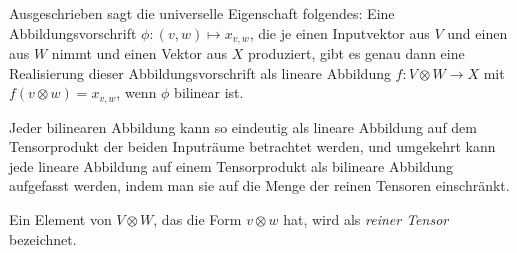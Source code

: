\begin{remark}
Ausgeschrieben sagt die universelle Eigenschaft folgendes: Eine Abbildungsvorschrift $\phi: (v,w) \mapsto x_{v,w}$, die je einen Inputvektor aus $V$ und einen aus $W$ nimmt und einen Vektor aus $X$ produziert, gibt es genau dann eine Realisierung dieser Abbildungsvorschrift als lineare Abbildung $f: V\otimes W\to X$ mit $f(v\otimes w) = x_{v,w}$, wenn $\phi$ bilinear ist.

Jeder bilinearen Abbildung kann so eindeutig als lineare Abbildung auf dem Tensorprodukt der beiden Inputräume betrachtet werden, und umgekehrt kann jede lineare Abbildung auf einem Tensorprodukt als bilineare Abbildung aufgefasst werden, indem man sie auf die Menge der reinen Tensoren einschränkt.
\end{remark}

\begin{definition}\label{tensoren:reine_tensoren}
Ein Element von $V\otimes W$, das die Form $v\otimes w$ hat, wird als \emph{reiner Tensor} bezeichnet.
\end{definition}

